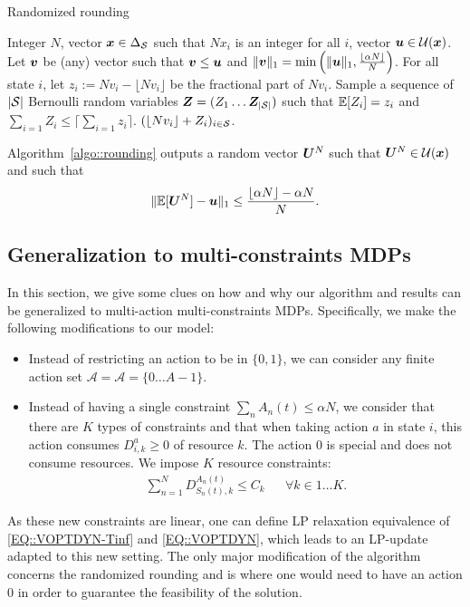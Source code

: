 \begin{algorithm}[ht]
	\caption{Randomized rounding}
	\label{algo::rounding}
	\begin{algorithmic}
        \REQUIRE Integer $N$, vector ${\bm{x}}\in\Delta_\mathcal{S}$ such that $Nx_i$ is an integer for all $i$, vector $\bm{u}\in\mathcal{U}({\bm{x}})$.
        \STATE Let $\bm{v}$ be (any) vector such that $\bm{v}\le\bm{u}$ and $\|\bm{v}\|_1 = \min\left(\|\bm{u}\|_1,\frac{\lfloor \alpha N\rfloor}{N}\right)$.
        \STATE For all state $i$, let $z_i := Nv_i - \lfloor N v_i \rfloor$ be the fractional part of $Nv_i$. 
        \STATE Sample a sequence of $|\mathcal{S}|$ Bernoulli random variables $\bZ=(Z_1\dots \bZ_{|\sspace|})$ such that $\mathbb{E}[Z_i]=z_i$ and $\sum_{i=1}Z_i\le \lceil \sum_{i=1}z_i\rceil$.
        \ENSURE $(\lfloor Nv_i \rfloor + Z_i)_{i\in\mathcal{S}}$.
    \end{algorithmic}
\end{algorithm}

\begin{lemma}\label{apx::lem_round}
    Algorithm~\ref{algo::rounding} outputs a random vector $\bm{U}^N$ such that $\bm{U}^N\in\mathcal{U}({\bm{x}})$ and such that
    \begin{align*}
        \|\mathbb{E}[\bm{U}^N] - \bm{u} \|_1 \le \frac{\lfloor \alpha N \rfloor-\alpha N}{N}.
    \end{align*}
\end{lemma}

\subsection{Generalization to multi-constraints MDPs}
\label{apx:generalization}

In this section, we give some clues on how and why our algorithm and results can be generalized to multi-action multi-constraints MDPs. Specifically, we make the following modifications to our model:
\begin{itemize}
    \item Instead of restricting an action to be in $\{0,1\}$, we can consider any finite action set $\mathcal{A} = \mathcal{A} =  \{0\dots A-1\}$.
    \item Instead of having a single constraint $\sum_n A_n(t)\le \alpha N$, we consider that there are $K$ types of constraints and that when taking action $a$ in state $i$, this action consumes $D^a_{i,k}\ge0$ of resource $k$. The action $0$ is special and does not consume resources. We impose $K$ resource constraints:
    \begin{align*}
        \sum_{n=1}^N D^{A_n(t)}_{S_n(t), k} \le C_k && \forall k\in{1\dots K}.
    \end{align*}
\end{itemize}
As these new constraints are linear, one can define LP relaxation equivalence of \eqref{EQ::VOPTDYN-Tinf} and \eqref{EQ::VOPTDYN}, which leads to an LP-update adapted to this new setting. The only major modification of the algorithm concerns the randomized rounding and is where one would need to have an action $0$ in order to guarantee the feasibility of the solution. 

